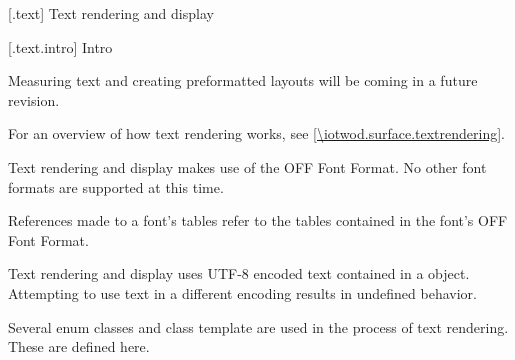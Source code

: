 
 [\iotwod.text] {Text rendering and display}

 [\iotwod.text.intro] {Intro}

\pnum
\begin{note}
Measuring text and creating preformatted layouts will be coming in a future revision.
\end{note}

\pnum
For an overview of how text rendering works, see \ref{\iotwod.surface.textrendering}.

\pnum
Text rendering and display makes use of the OFF Font Format. No other font formats are supported at this time.

\pnum
References made to a font's tables refer to the tables contained in the font's OFF Font Format.

\pnum
Text rendering and display uses UTF-8 encoded text contained in a  object. Attempting to use text in a different encoding results in undefined behavior.

\pnum
Several enum classes and class template are used in the process of text rendering. These are defined here.

\addtocounter{SectionDepthBase}{1}



%








\addtocounter{SectionDepthBase}{-1}

